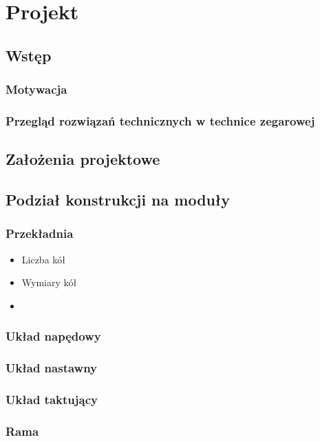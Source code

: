 \chapter{Projekt}
    \section{Wstęp}
        \subsection{Motywacja}
        \subsection{Przegląd rozwiązań technicznych w technice zegarowej}

    \section{Założenia projektowe}

    \section{Podział konstrukcji na moduły}
        \subsection{Przekładnia}
            \begin{itemize}
                \item Liczba kół
                \item Wymiary kół
                \item 
            \end{itemize}
        \subsection{Układ napędowy}
        \subsection{Układ nastawny}
        \subsection{Układ taktujący}
        \subsection{Rama}
